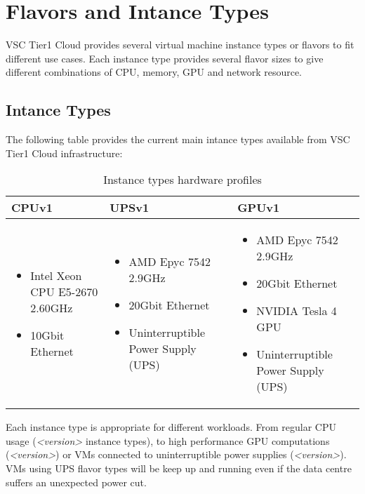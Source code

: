 \chapter{Flavors and Intance Types}

VSC Tier1 Cloud provides several virtual machine instance types or flavors to fit different use cases.
Each instance type provides several flavor sizes to give different combinations of CPU, memory, GPU and network resource.

\section{Intance Types}\label{sec:instance-types}
The following table provides the current main intance types available from VSC Tier1 Cloud infrastructure:

\begin{table}[h!]
\centering
\begin{tabular}{ |p{4cm}|p{5cm}|p{5cm}| }
  \hline
  \rowcolor{lightgray} \textbf{CPUv1} & \textbf{UPSv1} & \textbf{GPUv1} \\
  \hline
  \begin{itemize}
    \item Intel Xeon CPU E5-2670 2.60GHz
    \item 10Gbit Ethernet
  \end{itemize}
  &
  \begin{itemize}
    \item AMD Epyc 7542 2.9GHz
    \item 20Gbit Ethernet
    \item Uninterruptible Power Supply (UPS)
  \end{itemize}
  &
  \begin{itemize}
    \item AMD Epyc 7542 2.9GHz
    \item 20Gbit Ethernet
    \item NVIDIA Tesla 4 GPU
    \item Uninterruptible Power Supply (UPS)
  \end{itemize}
  \\
  \hline
\end{tabular}
\caption{Instance types hardware profiles}
\label{table:intance-type}
\end{table}

Each instance type is appropriate for different workloads. From regular CPU usage (\emph{<version>} instance types), to high performance GPU computations (\emph{<version>}) or VMs connected to uninterruptible power supplies (\emph{<version>}). VMs using UPS flavor types will be keep up and running even if the data centre suffers an unexpected power cut. 

